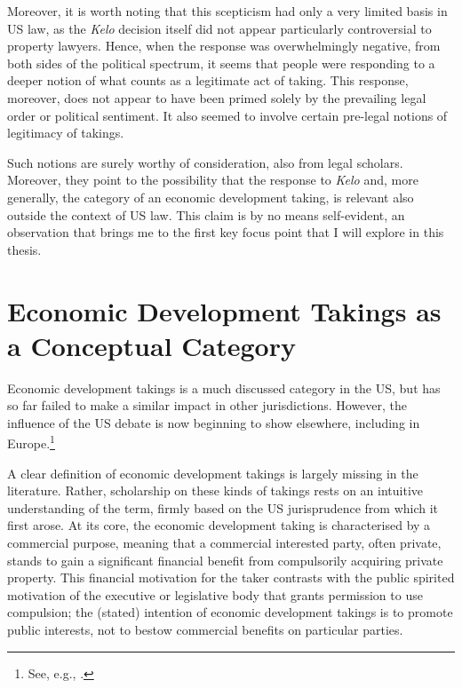 Moreover, it is worth noting that this scepticism had only a very limited basis in US law, as the {\it Kelo} decision itself did not appear particularly controversial to property lawyers. Hence, when the response was overwhelmingly negative, from both sides of the political spectrum, it seems that people were responding to a deeper notion of what counts as a legitimate act of taking. This response, moreover, does not appear to have been primed solely by the prevailing legal order or political sentiment. It also seemed to involve certain pre-legal notions of legitimacy of takings.

Such notions are surely worthy of consideration, also from legal scholars. Moreover, they point to the possibility that the response to {\it Kelo} and, more generally, the category of an economic development taking, is relevant also outside the context of US law. This claim is by no means self-evident, an observation that brings me to the first key focus point that I will explore in this thesis.

\section{Economic Development Takings as a Conceptual Category}

Economic development takings is a much discussed category in the US, but has so far failed to make a similar impact in other jurisdictions. However, the influence of the US debate is now beginning to show elsewhere, including in Europe.\footnote{See, e.g., \cite{verstappen14}.}

A clear definition of economic development takings is largely missing in the literature. Rather, scholarship on these kinds of takings rests on an intuitive understanding of the term, firmly based on the US jurisprudence from which it first arose. At its core, the economic development taking is characterised by a commercial purpose, meaning that a commercial interested party, often private, stands to gain a significant financial benefit from compulsorily acquiring private property. This financial motivation for the taker contrasts with the public spirited motivation of the executive or legislative body that grants permission to use compulsion; the (stated) intention of economic development takings is to promote public interests, not to bestow commercial benefits on particular parties.

